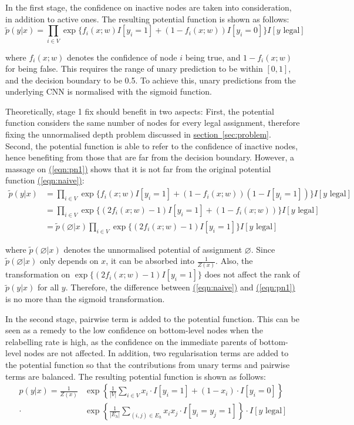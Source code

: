 \documentclass[11pt,a4paper]{article}
\begin{document}
In the first stage, the confidence on inactive nodes are taken into consideration, in addition to active ones. The resulting potential function is shown as follows:
\begin{equation}
\tilde{p}(y|x)=\prod_{i\in V}\exp\{f_i(x;w)I[y_i=1]+(1-f_i(x;w))I[y_i=0]\}I[y\text{ legal}]
\label{eqn:pn1}
\end{equation}

where $f_i(x;w)$ denotes the confidence of node $i$ being true, and $1-f_i(x;w)$ for being false. This requires the range of unary prediction to be within $[0,1]$, and the decision boundary to be 0.5. To achieve this, unary predictions from the underlying CNN is normalised with the sigmoid function.

Theoretically, stage 1 fix should benefit in two aspects: First, the potential function considers the same number of nodes for every legal assignment, therefore fixing the unnormalised depth problem discussed in \hyperref[sec:problem]{section~\ref{sec:problem}}. Second, the potential function is able to refer to the confidence of inactive nodes, hence benefiting from those that are far from the decision boundary. However, a massage on \hyperref[eqn:pn1]{(\ref{eqn:pn1})} shows that it is not far from the original potential function \hyperref[eqn:naive]{(\ref{eqn:naive})}:
\begin{align}
\tilde{p}(y|x)&=\prod_{i\in V}\exp\{f_i(x;w)I[y_i=1]+(1-f_i(x;w))(1-I[y_i=1])\}I[y\text{ legal}]\nonumber\\
&=\prod_{i\in V}\exp\{(2f_i(x;w)-1)I[y_i=1]+(1-f_i(x;w))\}I[y\text{ legal}]\nonumber\\
&=\tilde{p}(\varnothing|x)\prod_{i\in V}\exp\{(2f_i(x;w)-1)I[y_i=1]\}I[y\text{ legal}]
\end{align}

where $\tilde{p}(\varnothing|x)$ denotes the unnormalised potential of assignment $\varnothing$. Since $\tilde{p}(\varnothing|x)$ only depends on $x$, it can be absorbed into $\frac{1}{Z(x)}$. Also, the transformation on $\exp\{(2f_i(x;w)-1)I[y_i=1]\}$ does not affect the rank of $\tilde{p}(y|x)$ for all $y$. Therefore, the difference between \hyperref[eqn:naive]{(\ref{eqn:naive})} and \hyperref[eqn:pn1]{(\ref{eqn:pn1})} is no more than the sigmoid transformation.

In the second stage, pairwise term is added to the potential function. This can be seen as a remedy to the low confidence on bottom-level nodes when the relabelling rate is high, as the confidence on the immediate parents of bottom-level nodes are not affected. In addition, two regularisation terms are added to the potential function so that the contributions from unary terms and pairwise terms are balanced. The resulting potential function is shown as follows:
\begin{align}
p(y|x)=\frac{1}{Z(x)}&\exp\left\{\frac{1}{|V|}\sum_{i\in V}x_i\cdot I[y_i=1]+(1-x_i)\cdot I[y_i=0]\right\}\nonumber\\
\cdot&\exp\left\{\frac{1}{|E_h|}\sum_{(i,j)\in E_h}x_ix_j\cdot I[y_i=y_j=1]\right\}\cdot I[y\text{ legal}]
\label{eqn:pn2}
\end{align}
\end{document}
